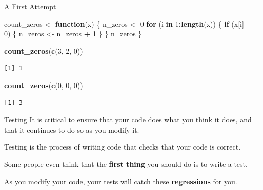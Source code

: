 \documentclass[
  ignorenonframetext,
  aspectratio=1610,
  onlytextwidth]{beamer}
\newenvironment{Shaded}{\begin{snugshade}}{\end{snugshade}}
\newcommand{\ControlFlowTok}[1]{\textcolor[rgb]{0.13,0.29,0.53}{\textbf{#1}}}
\newcommand{\DecValTok}[1]{\textcolor[rgb]{0.00,0.00,0.81}{#1}}
\newcommand{\FunctionTok}[1]{\textcolor[rgb]{0.13,0.29,0.53}{\textbf{#1}}}
\newcommand{\NormalTok}[1]{#1}
\newcommand{\OtherTok}[1]{\textcolor[rgb]{0.56,0.35,0.01}{#1}}
\newcommand{\SpecialCharTok}[1]{\textcolor[rgb]{0.81,0.36,0.00}{\textbf{#1}}}
\begin{document}
\begin{frame}[fragile]{A First Attempt}
\label{a-first-attempt}
\begin{Shaded}
\begin{Highlighting}[]
\NormalTok{count\_zeros }\OtherTok{\textless{}{-}} \ControlFlowTok{function}\NormalTok{(x) \{}
\NormalTok{  n\_zeros }\OtherTok{\textless{}{-}} \DecValTok{0}
  \ControlFlowTok{for}\NormalTok{ (i }\ControlFlowTok{in} \DecValTok{1}\SpecialCharTok{:}\FunctionTok{length}\NormalTok{(x)) \{}
    \ControlFlowTok{if}\NormalTok{ (x[i] }\SpecialCharTok{==} \DecValTok{0}\NormalTok{) \{}
\NormalTok{      n\_zeros }\OtherTok{\textless{}{-}}\NormalTok{ n\_zeros }\SpecialCharTok{+} \DecValTok{1}
\NormalTok{    \}}
\NormalTok{  \}}
\NormalTok{  n\_zeros}
\NormalTok{\}}
\end{Highlighting}
\end{Shaded}

\pause

\begin{Shaded}
\begin{Highlighting}[]
\FunctionTok{count\_zeros}\NormalTok{(}\FunctionTok{c}\NormalTok{(}\DecValTok{3}\NormalTok{, }\DecValTok{2}\NormalTok{, }\DecValTok{0}\NormalTok{))}
\end{Highlighting}
\end{Shaded}

\begin{verbatim}
[1] 1
\end{verbatim}

\pause

\begin{Shaded}
\begin{Highlighting}[]
\FunctionTok{count\_zeros}\NormalTok{(}\FunctionTok{c}\NormalTok{(}\DecValTok{0}\NormalTok{, }\DecValTok{0}\NormalTok{, }\DecValTok{0}\NormalTok{))}
\end{Highlighting}
\end{Shaded}

\begin{verbatim}
[1] 3
\end{verbatim}
\end{frame}

\begin{frame}{Testing}
\label{testing}
It is critical to ensure that your code does what you think it does, and
that it continues to do so as you modify it.

\pause

\bigskip

Testing is the process of writing code that checks that your code is
correct.

\pause

\bigskip

Some people even think that the \textbf{first thing} you should do is to
write a test.

\pause

\bigskip

As you modify your code, your tests will catch these
\textbf{regressions} for you.
\end{frame}
\end{document}
